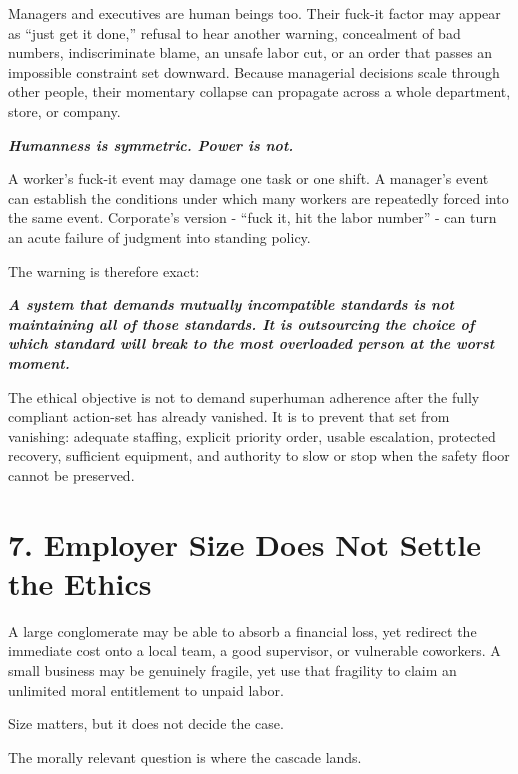 \documentclass[11pt,oneside]{article}
\renewenvironment{quote}
  {\begin{tcolorbox}[
      enhanced,
      breakable,
      colback=ManifestLight,
      colframe=ManifestRule,
      boxrule=0pt,
      leftrule=3pt,
      arc=0pt,
      outer arc=0pt,
      left=10pt,right=10pt,top=8pt,bottom=8pt,
      before skip=0.8em,after skip=0.8em
    ]\itshape}
  {\end{tcolorbox}}
\begin{document}
Managers and executives are human beings too. Their fuck-it factor may
appear as ``just get it done,'' refusal to hear another warning,
concealment of bad numbers, indiscriminate blame, an unsafe labor cut,
or an order that passes an impossible constraint set downward. Because
managerial decisions scale through other people, their momentary
collapse can propagate across a whole department, store, or company.

\begin{quote}
\textbf{Humanness is symmetric. Power is not.}
\end{quote}

A worker's fuck-it event may damage one task or one shift. A manager's
event can establish the conditions under which many workers are
repeatedly forced into the same event. Corporate's version - ``fuck it,
hit the labor number'' - can turn an acute failure of judgment into
standing policy.

The warning is therefore exact:

\begin{quote}
\textbf{A system that demands mutually incompatible standards is not
maintaining all of those standards. It is outsourcing the choice of
which standard will break to the most overloaded person at the worst
moment.}
\end{quote}

The ethical objective is not to demand superhuman adherence after the
fully compliant action-set has already vanished. It is to prevent that
set from vanishing: adequate staffing, explicit priority order, usable
escalation, protected recovery, sufficient equipment, and authority to
slow or stop when the safety floor cannot be preserved.

\section{7. Employer Size Does Not Settle the
Ethics}\label{employer-size-does-not-settle-the-ethics}

A large conglomerate may be able to absorb a financial loss, yet
redirect the immediate cost onto a local team, a good supervisor, or
vulnerable coworkers. A small business may be genuinely fragile, yet use
that fragility to claim an unlimited moral entitlement to unpaid labor.

Size matters, but it does not decide the case.

The morally relevant question is where the cascade lands.
\end{document}
